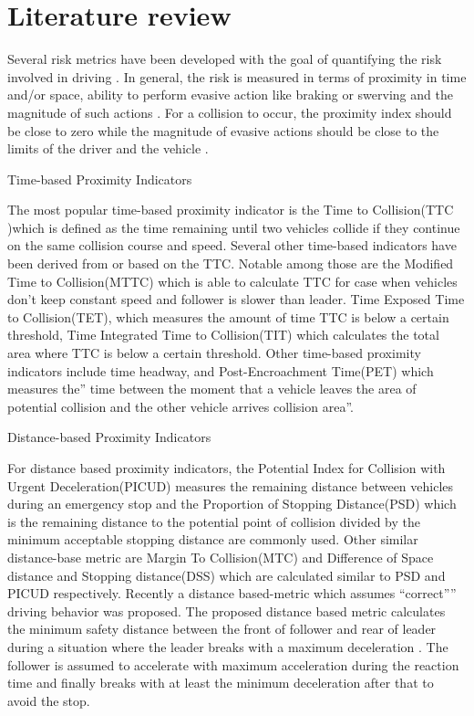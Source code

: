 \section{Literature review}
\label{sec:literature review}

Several risk metrics have been developed with the goal of quantifying the risk involved in driving \autocite{minderhoud2001extended, ozbay2008derivation, cunto2009simulated, laureshyn2010evaluation}.
In general, the risk is measured in terms of proximity in time and/or space, ability to perform evasive action like braking or swerving and the magnitude of such actions \autocite{shi2018key,zheng2020modeling}. 
For a collision to occur, the proximity index should be close to zero while the magnitude of evasive actions should be close to the limits of the driver and the vehicle \autocite{zheng2020modeling}. 

Time-based Proximity Indicators

The most popular time-based proximity indicator is the Time to Collision(TTC )which  is defined as the time remaining until two vehicles collide if they continue on the same collision course and speed\autocite{van1990time,hyden1996traffic}. Several other time-based indicators have been derived from  or based on the TTC. Notable among those are the Modified Time to Collision(MTTC) which is able to  calculate TTC for case when vehicles don’t keep constant speed and follower is slower than leader\autocite{ozbay2008derivation}. Time Exposed Time to Collision(TET), which measures the amount of time TTC is below a certain threshold, Time Integrated Time to Collision(TIT) which calculates the total area where TTC is below a certain threshold\autocite{minderhoud2001extended}. Other time-based proximity indicators include time headway, and Post-Encroachment Time(PET) which measures the” time between the moment that a vehicle leaves the area of potential collision and the other vehicle arrives collision area”\autocite{mahmud2017application}. 

Distance-based Proximity Indicators

For distance based proximity indicators, the Potential Index for Collision with Urgent Deceleration(PICUD) measures the remaining distance between vehicles during an emergency stop\autocite{iida2001traffic,uno2003objective} and the Proportion of Stopping Distance(PSD) which is  the remaining distance to the potential point of collision divided by the minimum acceptable stopping distance\autocite{allen1978analysis,guido2011comparing,mahmud2017application} are commonly used. Other similar distance-base metric are Margin To Collision(MTC)  and  Difference of Space distance and Stopping distance(DSS) which are calculated similar to PSD and PICUD respectively\autocite{kitajima2009estimation,okamura2011impact}. Recently a distance based-metric which assumes “correct”” driving behavior was proposed\autocite{shalev2017formal}. The proposed distance based metric calculates the minimum safety distance between the front of follower and rear of leader during a situation where the leader breaks with a maximum deceleration . The follower is assumed to accelerate with maximum acceleration during the reaction time and finally breaks with at least the minimum deceleration after that to avoid the stop. 

